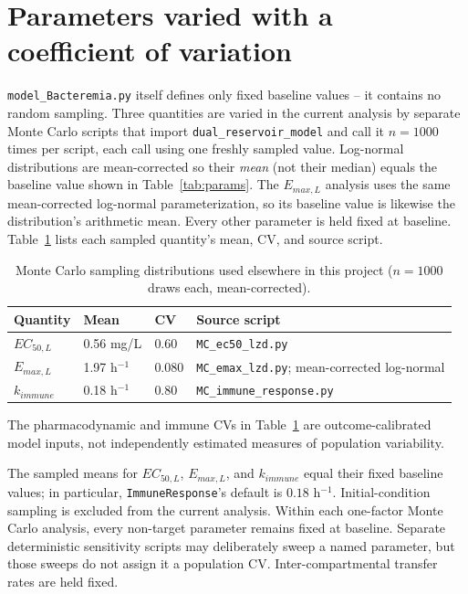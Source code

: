 \documentclass[11pt]{article}
\begin{document}
\section{Parameters varied with a coefficient of variation}

\texttt{model\_Bacteremia.py} itself defines only fixed baseline values --
it contains no random sampling. Three quantities are varied in the current
analysis by separate Monte Carlo scripts that import
\texttt{dual\_reservoir\_model} and call it $n=1000$ times per script, each
call using one freshly sampled value. Log-normal distributions are
mean-corrected so their \emph{mean} (not their median) equals the baseline
value shown in Table~\ref{tab:params}. The $E_{max,L}$ analysis uses the same
mean-corrected log-normal parameterization, so its baseline value is likewise
the distribution's arithmetic mean. Every other parameter is held fixed at
baseline. Table~\ref{tab:cv} lists each sampled quantity's mean, CV, and
source script.

\begin{table}[H]
\centering
\small
\renewcommand{\arraystretch}{1.15}
\caption{Monte Carlo sampling distributions used elsewhere in this project
($n=1000$ draws each, mean-corrected).}
\vspace{0.5cm}
\begin{tabularx}{\textwidth}{l l l X}
\hline
\textbf{Quantity} & \textbf{Mean} & \textbf{CV} & \textbf{Source script} \\
\hline
$EC_{50,L}$ & 0.56 mg/L & 0.60 & \texttt{MC\_ec50\_lzd.py} \\
$E_{max,L}$ & 1.97 h$^{-1}$ & 0.080 & \texttt{MC\_emax\_lzd.py}; mean-corrected log-normal \\
$k_{immune}$ & 0.18 h$^{-1}$ & 0.80 & \texttt{MC\_immune\_response.py} \\
\hline
\end{tabularx}
\label{tab:cv}
\end{table}

The pharmacodynamic and immune CVs in Table~\ref{tab:cv} are
outcome-calibrated model inputs, not independently estimated measures of
population variability.

The sampled means for $EC_{50,L}$, $E_{max,L}$, and $k_{immune}$ equal their
fixed baseline values; in particular, \texttt{ImmuneResponse}'s default is
$0.18$ h$^{-1}$. Initial-condition sampling is excluded from the current
analysis. Within each one-factor Monte Carlo analysis, every non-target
parameter remains fixed at baseline. Separate deterministic sensitivity
scripts may deliberately sweep a named parameter, but those sweeps do not
assign it a population CV. Inter-compartmental transfer rates are held fixed.
\end{document}
